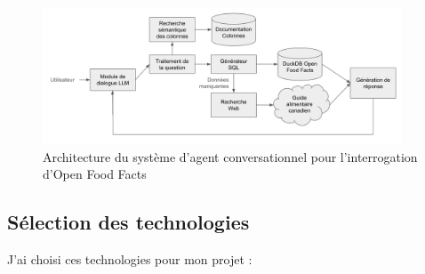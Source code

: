 \documentclass[a4paper,11pt]{article}
\begin{document}
\begin{figure}[H]
    \centering
    \includegraphics[width=0.95\textwidth]{figures/architecture-agent.png}
    \caption{Architecture du système d'agent conversationnel pour l'interrogation d'Open Food Facts}
    \label{fig:architecture}
\end{figure}

\subsection{Sélection des technologies}

J'ai choisi ces technologies pour mon projet :
\end{document}
